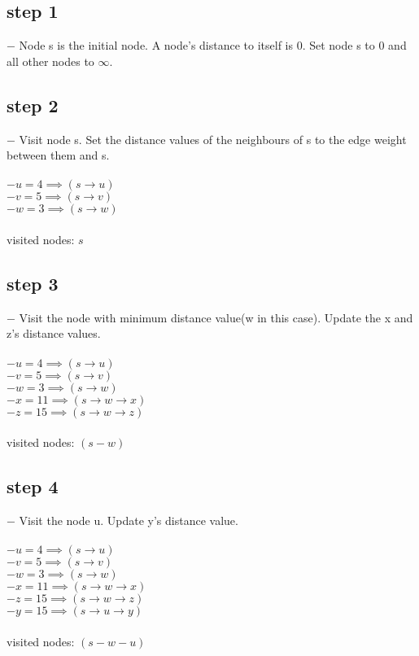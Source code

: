 \documentclass[12pt]{article}
\begin{document}
\subsection*{step 1}
	$-$ Node s is the initial node. A node's distance to itself is 0. Set node s to 0 and all other nodes to $\infty$.\\

\subsection*{step 2}
	$-$ Visit node s. Set the distance values of the neighbours of s to the edge weight between them and s.\\
	\\
	$-$$u = 4 \implies (s \rightarrow u)$\\
	$-$$v = 5 \implies (s \rightarrow v)$\\
	$-$$w = 3 \implies (s \rightarrow w)$\\
	\\
	visited nodes: $s$\\

\subsection*{step 3}
	$-$ Visit the node with minimum distance value(w in this case). Update the x and z's distance values.\\
	\\
	$-$$u = 4 \implies (s \rightarrow u)$\\
	$-$$v = 5 \implies (s \rightarrow v)$\\
	$-$$w = 3 \implies (s \rightarrow w)$\\
	$-$$x = 11 \implies (s \rightarrow w \rightarrow x)$\\
	$-$$z = 15 \implies (s \rightarrow w \rightarrow z)$\\
	\\
	visited nodes: $(s-w)$\\

\subsection*{step 4}

	$-$ Visit the node u. Update y's distance value.\\
	\\
	$-$$u = 4 \implies (s \rightarrow u)$\\
	$-$$v = 5 \implies (s \rightarrow v)$\\
	$-$$w = 3 \implies (s \rightarrow w)$\\
	$-$$x = 11 \implies (s \rightarrow w \rightarrow x)$\\
	$-$$z = 15 \implies (s \rightarrow w \rightarrow z)$\\
	$-$$y = 15 \implies (s \rightarrow u \rightarrow y)$\\
	\\
	visited nodes: $(s-w-u)$\\
\end{document}

